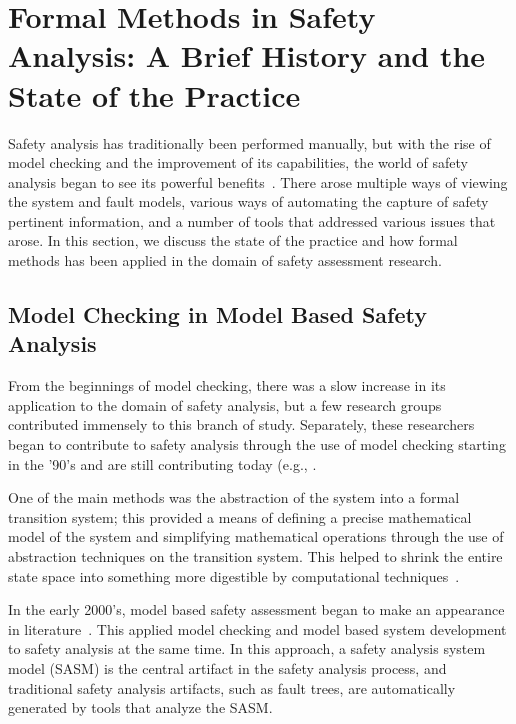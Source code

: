 \section{Formal Methods in Safety Analysis: A Brief History and the State of the Practice}
\label{sec:modelCheckingInSA}
Safety analysis has traditionally been performed manually, but with the rise of model checking and the improvement of its capabilities, the world of safety analysis began to see its powerful benefits~\cite{hinchey2012industrial, liggesmeyer1998improving, coudert1993fault, Bozzano:2010:DSA:1951720,bozzano2003esacs}. There arose multiple ways of viewing the system and fault models, various ways of automating the capture of safety pertinent information, and a number of tools that addressed various issues that arose. In this section, we discuss the state of the practice and how formal methods has been applied in the domain of safety assessment research.

\subsection{Model Checking in Model Based Safety Analysis}
From the beginnings of model checking, there was a slow increase in its application to the domain of safety analysis, but a few research groups contributed immensely to this branch of study. Separately, these researchers began to contribute to safety analysis through the use of model checking starting in the '90's and are still contributing today (e.g., \cite{reese1997software,signoret1998altarica,chiappini1999formal,cimatti2000industrial}. 

One of the main methods was the abstraction of the system into a formal transition system; this provided a means of defining a precise mathematical model of the system and simplifying mathematical operations through the use of abstraction techniques on the transition system. This helped to shrink the entire state space into something more digestible by computational techniques~\cite{d2008survey}. 

In the early 2000's, model based safety assessment began to make an appearance in literature~\cite{Bozzano:2010:DSA:1951720,Joshi05:Dasc, Joshi05:SafeComp, Joshi07:Hase}. This applied model checking and model based system development to safety analysis at the same time.  In this approach, a safety analysis system model (SASM) is the central artifact in the safety analysis process, and traditional safety analysis artifacts, such as fault trees, are automatically generated by tools that analyze the SASM.

